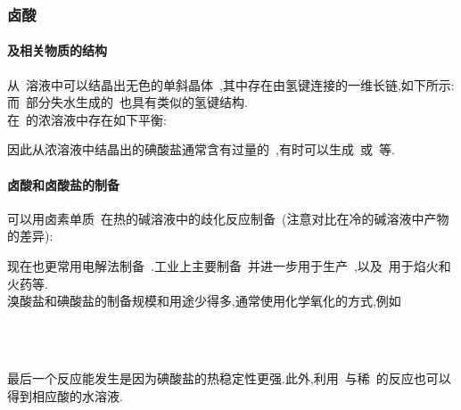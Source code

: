 \documentclass{ctexbook}
\begin{document}
\subsubsection{卤酸~}
\paragraph{及相关物质的结构}
从~溶液中可以结晶出无色的单斜晶体~,其中存在由氢键连接的一维长链,如下所示\cite{Stahl1993}:
\noindent 而~部分失水生成的~也具有类似的氢键结构\cite{Fischer2005}.\\
\indent 在~的浓溶液中存在如下平衡:
\begin{tightcenter}
\end{tightcenter}
因此从浓溶液中结晶出的碘酸盐通常含有过量的~,有时可以生成~或~等.
\paragraph{卤酸和卤酸盐的制备}
可以用卤素单质~在热的碱溶液中的歧化反应制备~(注意对比在冷的碱溶液中产物的差异):
\begin{tightcenter}
\end{tightcenter}
现在也更常用电解法制备~.工业上主要制备~并进一步用于生产~,以及~用于焰火和火药等.\\
\indent 溴酸盐和碘酸盐的制备规模和用途少得多,通常使用化学氧化的方式,例如
\begin{tightcenter}
    \\
    \\
\end{tightcenter}
最后一个反应能发生是因为碘酸盐的热稳定性更强.此外,利用~与稀~的反应也可以得到相应酸的水溶液.
\end{document}
